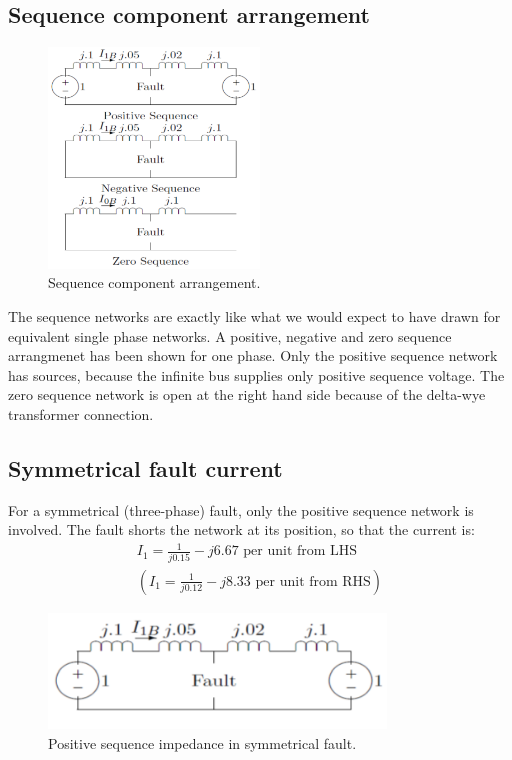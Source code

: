 \subsection{Sequence component arrangement}
\begin{figure}[H]
	\centering
	\includegraphics[width = 0.5\textwidth]{./img/figure40.png}
	\caption{Sequence component arrangement.}
\end{figure}
The sequence networks are exactly like what we would expect to have drawn for equivalent single phase networks. A positive, negative and zero sequence arrangmenet has been shown for one phase. Only the positive sequence network has sources, because the infinite bus supplies only positive sequence voltage. The zero sequence network is open at the right hand side because of the delta-wye transformer connection.
\subsection{Symmetrical fault current}
For a symmetrical (three-phase) fault, only the positive sequence network is involved. The fault shorts the network at its position, so that the current is:
\begin{gather}
	I_1 = \frac{1}{j0.15} - j6.67 \textrm{ per unit from LHS}\\
	(I_1 = \frac{1}{j0.12} - j8.33 \textrm{ per unit from RHS})
\end{gather}
\begin{figure}[H]
	\centering
	\includegraphics[width = 0.8\textwidth]{./img/figure41.png}
	\caption{Positive sequence impedance in symmetrical fault.}
\end{figure}
